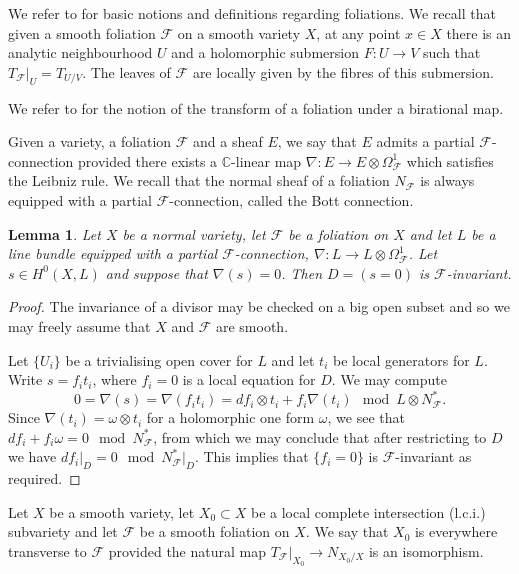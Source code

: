 \documentclass[12pt]{amsart}
\theoremstyle{plain}
\newtheorem{lemma}[theorem]{Lemma}
\theoremstyle{definition}
\begin{document}
We refer to \cite{Brunella00} for basic notions and definitions regarding foliations.
We recall that given a smooth foliation $\mathcal F$ on a smooth variety $X$, at any point $x \in X$ 
there is an analytic neighbourhood $U$ and a holomorphic submersion $F\colon U \rightarrow V$
such that $T_{\mathcal F}|_U = T_{U/V}$.  The leaves of $\mathcal F$ are locally given by the fibres of this submersion.

We refer to \cite[\S~2.3]{CS21} for the notion of the transform of a foliation under a birational map.


Given a variety, a foliation $\mathcal F$ and a sheaf $E$, we say that $E$ admits a partial $\mathcal F$-connection
provided there exists a $\mathbb C$-linear map 
$\nabla\colon E \rightarrow E \otimes \Omega^1_{\mathcal F}$ which satisfies the
Leibniz rule.
We recall that the normal sheaf of a foliation $N_{\mathcal F}$ is always equipped with a partial $\mathcal F$-connection, called
the Bott connection.


\begin{lemma}
\label{lem_partial_connection_invariant}
Let $X$ be a normal variety, let $\mathcal F$ be a foliation on $X$ and let $L$ be a line bundle 
equipped with a partial $\mathcal F$-connection, 
$\nabla\colon L \rightarrow L \otimes \Omega^1_{\mathcal F}$.
Let $s \in H^0(X, L)$ and suppose that $\nabla(s) = 0$.  Then $D = (s = 0)$ is $\mathcal F$-invariant.
\end{lemma}
\begin{proof}
The invariance of a divisor may be checked on a big open subset and so 
we may freely assume that $X$
and $\mathcal F$ are smooth.

Let $\{U_i\}$ be a trivialising open cover for $L$ and let $t_i$ be local generators for $L$.
Write $s = f_it_i$, where $f_i = 0$ is a local equation for $D$.  We may compute  
\[
0 = \nabla(s) = \nabla(f_it_i) = df_i\otimes t_i + f_i\nabla(t_i) \mod L \otimes  N^*_{\mathcal F}.
\]
Since $\nabla(t_i) = \omega\otimes t_i$ for a holomorphic one form $\omega$, we
see that $df_i +f_i\omega = 0 \mod N^*_{\mathcal F}$,
from which we may conclude that after restricting to $D$ we have  $df_i\vert_D = 0 \mod N^*_{\mathcal F}\vert_D$.
This implies that $\{f_i = 0\}$ is $\mathcal F$-invariant
as required. 
\end{proof}


Let $X$ be a smooth variety, let $X_0 \subset X$ be a local complete intersection (l.c.i.)
subvariety and let $\mathcal F$ be a smooth foliation
on $X$.  We say that $X_0$ is everywhere transverse to $\mathcal F$ provided the natural map 
$T_{\mathcal F}\vert_{X_0} \rightarrow N_{X_0/X}$ is an isomorphism.  
\end{document}
